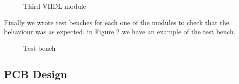 \documentclass[12pt]{article}
\begin{document}
\begin{figure}[H]
\caption{Third VHDL module}
\label{fig:vhdl3}
\end{figure}

Finally we wrote test benches for each one of the modules to check that the behaviour was as expected. in Figure \ref{fig:tb1} we have an example of the test bench.

\begin{figure}[H]
\caption{Test bench}
\label{fig:tb1}
\end{figure}

\subsection{PCB Design}
\end{document}
